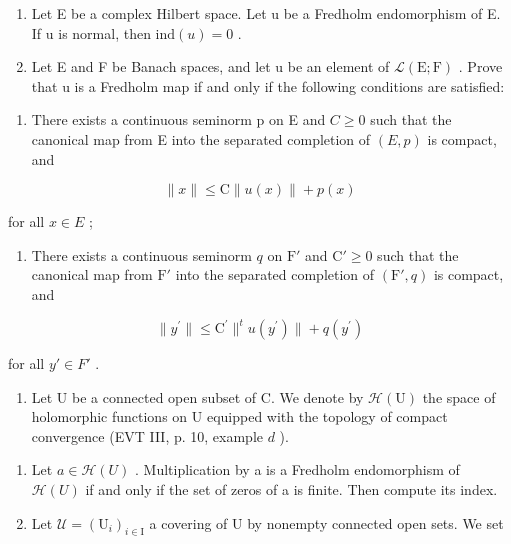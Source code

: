\begin{enumerate}
\def\labelenumi{\arabic{enumi})}
\setcounter{enumi}{5}
\item
  Let E be a complex Hilbert space. Let u be a Fredholm endomorphism of E. If u is normal, then \(\text{ind}(u) = 0\) .
\item
  Let E and F be Banach spaces, and let u be an element of \(\mathcal{L}(\mathrm{E};\mathrm{F})\) . Prove that u is a Fredholm map if and only if the following conditions are satisfied:
\end{enumerate}

\begin{enumerate}
\def\labelenumi{(\roman{enumi})}
\tightlist
\item
  There exists a continuous seminorm p on E and \(C \geqslant 0\) such that the canonical map from E into the separated completion of \((E, p)\) is compact, and
\end{enumerate}

\[
\| x \| \leqslant \mathrm{C} \| u (x) \| + p (x)
\]

for all \(x \in E\) ;

\begin{enumerate}
\def\labelenumi{(\roman{enumi})}
\setcounter{enumi}{1}
\tightlist
\item
  There exists a continuous seminorm \(q\) on \(\mathrm{F}'\) and \(\mathrm{C}' \geqslant 0\) such that the canonical map from \(\mathrm{F}'\) into the separated completion of \((\mathrm{F}', q)\) is compact, and
\end{enumerate}

\[
\| y ^ {\prime} \| \leqslant \mathrm{C} ^ {\prime} \| ^ {t} u (y ^ {\prime}) \| + q (y ^ {\prime})
\]

for all \(y' \in F'\) .

\begin{enumerate}
\def\labelenumi{\arabic{enumi})}
\setcounter{enumi}{7}
\tightlist
\item
  Let U be a connected open subset of C. We denote by \(\mathcal{H}(\mathrm{U})\) the space of holomorphic functions on U equipped with the topology of compact convergence (EVT III, p. 10, example \(d\) ).
\end{enumerate}

\begin{enumerate}
\def\labelenumi{\alph{enumi})}
\item
  Let \(a \in \mathcal{H}(U)\) . Multiplication by a is a Fredholm endomorphism of \(\mathcal{H}(U)\) if and only if the set of zeros of a is finite. Then compute its index.
\item
  Let \(\mathcal{U} = (\mathrm{U}_{i})_{i \in \mathrm{I}}\) a covering of U by nonempty connected open sets. We set
\end{enumerate}

